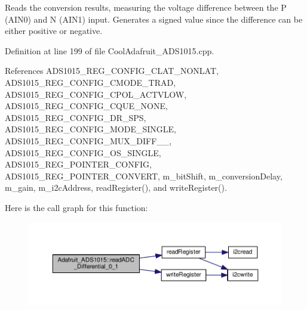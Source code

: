 Reads the conversion results, measuring the voltage difference between the P (A\+I\+N0) and N (A\+I\+N1) input. Generates a signed value since the difference can be either positive or negative. 



Definition at line 199 of file Cool\+Adafruit\+\_\+\+A\+D\+S1015.\+cpp.



References A\+D\+S1015\+\_\+\+R\+E\+G\+\_\+\+C\+O\+N\+F\+I\+G\+\_\+\+C\+L\+A\+T\+\_\+\+N\+O\+N\+L\+AT, A\+D\+S1015\+\_\+\+R\+E\+G\+\_\+\+C\+O\+N\+F\+I\+G\+\_\+\+C\+M\+O\+D\+E\+\_\+\+T\+R\+AD, A\+D\+S1015\+\_\+\+R\+E\+G\+\_\+\+C\+O\+N\+F\+I\+G\+\_\+\+C\+P\+O\+L\+\_\+\+A\+C\+T\+V\+L\+OW, A\+D\+S1015\+\_\+\+R\+E\+G\+\_\+\+C\+O\+N\+F\+I\+G\+\_\+\+C\+Q\+U\+E\+\_\+\+N\+O\+NE, A\+D\+S1015\+\_\+\+R\+E\+G\+\_\+\+C\+O\+N\+F\+I\+G\+\_\+\+D\+R\+\_\+S\+PS, A\+D\+S1015\+\_\+\+R\+E\+G\+\_\+\+C\+O\+N\+F\+I\+G\+\_\+\+M\+O\+D\+E\+\_\+\+S\+I\+N\+G\+LE, A\+D\+S1015\+\_\+\+R\+E\+G\+\_\+\+C\+O\+N\+F\+I\+G\+\_\+\+M\+U\+X\+\_\+\+D\+I\+F\+F\+\_\+\_, A\+D\+S1015\+\_\+\+R\+E\+G\+\_\+\+C\+O\+N\+F\+I\+G\+\_\+\+O\+S\+\_\+\+S\+I\+N\+G\+LE, A\+D\+S1015\+\_\+\+R\+E\+G\+\_\+\+P\+O\+I\+N\+T\+E\+R\+\_\+\+C\+O\+N\+F\+IG, A\+D\+S1015\+\_\+\+R\+E\+G\+\_\+\+P\+O\+I\+N\+T\+E\+R\+\_\+\+C\+O\+N\+V\+E\+RT, m\+\_\+bit\+Shift, m\+\_\+conversion\+Delay, m\+\_\+gain, m\+\_\+i2c\+Address, read\+Register(), and write\+Register().

Here is the call graph for this function\+:
\nopagebreak
\begin{figure}[H]
\begin{center}
\leavevmode
\includegraphics[width=350pt]{df/df6/class_adafruit___a_d_s1015_a56582333958e66efaccd3d4a8a47e3ff_cgraph}
\end{center}
\end{figure}
\mbox{\label{class_adafruit___a_d_s1015_a38311881bcab46f7496c4bb6e4cad576}} 
